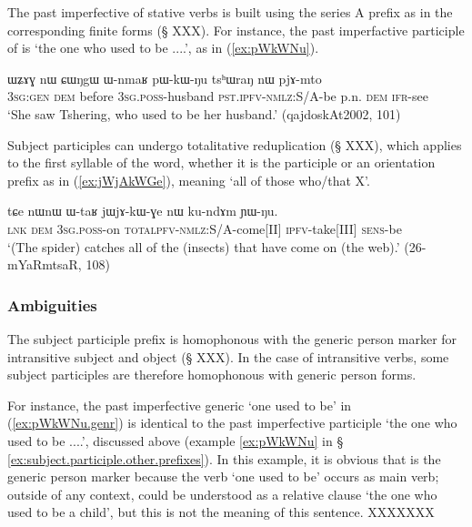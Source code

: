 The past imperfective of stative verbs is built using the series A prefix  as in the corresponding finite forms (§ XXX). For instance, the past imperfactive participle of  is  `the one who used to be ....', as in (\ref{ex:pWkWNu}).

\begin{exe}
\ex \label{ex:pWkWNu}
 \gll  ɯʑɤɣ nɯ ɕɯŋgɯ ɯ-nmaʁ pɯ-kɯ-ŋu tsʰɯraŋ nɯ pjɤ-mto \\
 \textsc{3sg}:\textsc{gen} \textsc{dem} before \textsc{3sg}.\textsc{poss}-husband \textsc{pst}.\textsc{ipfv}-\textsc{nmlz}:S/A-be p.n. \textsc{dem} \textsc{ifr}-see \\
\glt `She saw Tshering, who used to be her husband.' (qajdoskAt2002, 101)
\end{exe}

Subject participles can undergo totalitative reduplication (§ XXX), which applies to the first syllable of the word, whether it is the participle  or an orientation prefix as in (\ref{ex:jWjAkWGe}), meaning `all of those who/that X'.

\begin{exe}
\ex \label{ex:jWjAkWGe}
\gll tɕe nɯnɯ ɯ-taʁ jɯ\redp{}jɤ-kɯ-ɣe nɯ ku-ndɤm ɲɯ-ŋu. \\
\textsc{lnk} \textsc{dem} \textsc{3sg}.\textsc{poss}-on \textsc{total}\redp{}\textsc{pfv}-\textsc{nmlz}:S/A-come[II] \textsc{ipfv}-take[III] \textsc{sens}-be \\
\glt `(The spider) catches all of the (insects) that have come on (the web).' (26-mYaRmtsaR, 108)
\end{exe}

\subsubsection{Ambiguities}  \label{ex:subject.participle.ambiguities}
The subject participle  prefix is homophonous with the generic person marker for intransitive subject and object (§ XXX). In the case of intransitive verbs, some subject participles are therefore homophonous with generic person forms. 

For instance, the past imperfective generic  `one used to be' in (\ref{ex:pWkWNu.genr}) is identical to the past imperfective participle  `the one who used to be ....', discussed above (example \ref{ex:pWkWNu} in § \ref{ex:subject.participle.other.prefixes}). In this example, it is obvious that  is the generic person marker because the verb  `one used to be' occurs as main verb; outside of any context,   could be understood as a relative clause `the one who used to be a child', but this is not the meaning of this sentence. XXXXXXX

